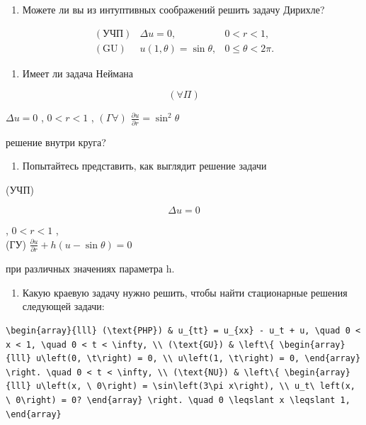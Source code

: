 \documentclass[
  ukrainian,
]{article}
\providecommand{\tightlist}{%
  \setlength{\itemsep}{0pt}\setlength{\parskip}{0pt}}
\begin{document}
\begin{enumerate}
\def\labelenumi{\arabic{enumi}.}
\tightlist
\item
  Можете ли вы из интуптивных соображений решить задачу Дирихле?
\end{enumerate}

\[
\begin{array}{lll} (\text{УЧП}) & \Delta u = 0, & 0 < r < 1, \\ (\text{GU}) & u(1, \theta) = \sin \theta, & 0 \leqslant \theta < 2\pi. \end{array}
\]

\begin{enumerate}
\def\labelenumi{\arabic{enumi}.}
\setcounter{enumi}{1}
\tightlist
\item
  Имеет ли задача Неймана
\end{enumerate}

\[
(\forall \Pi)
\]

\(\Delta u = 0\) , \(0 < r < 1\) , \((\Gamma \forall)\)
\(\frac{\partial u}{\partial r} = \sin^2 \theta\)

решение внутри круга?

\begin{enumerate}
\def\labelenumi{\arabic{enumi}.}
\setcounter{enumi}{2}
\tightlist
\item
  Попытайтесь представить, как выглядит решение задачи
\end{enumerate}

(УЧП)

\[
\Delta u = 0
\]

, \(0 < r < 1\) ,\\
(ГУ) \(\frac{\partial u}{\partial r} + h(u - \sin \theta) = 0\)

при различных значениях параметра h.

\begin{enumerate}
\def\labelenumi{\arabic{enumi}.}
\setcounter{enumi}{3}
\tightlist
\item
  Какую краевую задачу нужно решить, чтобы найти стационарные решения
  следующей задачи:
\end{enumerate}

\begin{verbatim}
\begin{array}{lll} (\text{PHP}) & u_{tt} = u_{xx} - u_t + u, \quad 0 < x < 1, \quad 0 < t < \infty, \\ (\text{GU}) & \left\{ \begin{array}{lll} u\left(0, \t\right) = 0, \\ u\left(1, \t\right) = 0, \end{array} \right. \quad 0 < t < \infty, \\ (\text{NU}) & \left\{ \begin{array}{lll} u\left(x, \ 0\right) = \sin\left(3\pi x\right), \\ u_t\ left(x, \ 0\right) = 0? \end{array} \right. \quad 0 \leqslant x \leqslant 1, \end{array}
\end{verbatim}
\end{document}
